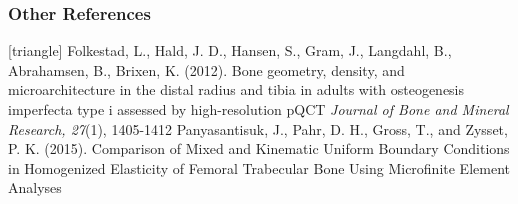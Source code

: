 \documentclass[xcolor=table]{beamer}
\begin{document}

\begin{frame}
	\frametitle{Other References}
	\footnotesize{
		\begin{thebibliography}{99}
			[triangle]
			 Folkestad, L., Hald, J. D., Hansen, S., Gram, J., Langdahl, B., Abrahamsen, B., Brixen, K. (2012).
			\newblock Bone geometry, density, and microarchitecture in the distal radius and tibia in adults with osteogenesis imperfecta type i assessed by high-resolution pQCT
			\newblock \textit{Journal of Bone and Mineral Research, 27}(1), 1405-1412
			\vspace{1mm}
			 Panyasantisuk, J., Pahr, D. H., Gross, T., and Zysset, P. K. (2015).
			\newblock Comparison of Mixed and Kinematic Uniform Boundary Conditions in Homogenized Elasticity of Femoral Trabecular Bone Using Microfinite Element Analyses
		\end{thebibliography}
	}
\end{frame}

\end{document}
